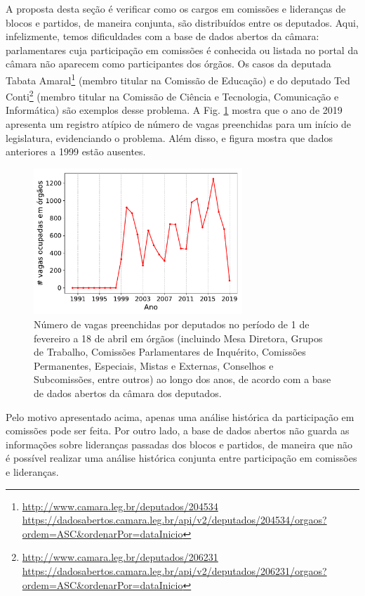 \documentclass[12pt,a4paper]{article}
\newcommand{\footurl}[1]{{\scriptsize\url{#1}}}
\begin{document}
A proposta desta seção é verificar como os cargos em comissões e lideranças de blocos e partidos,
de maneira conjunta, são distribuídos entre os deputados. Aqui, infelizmente, temos dificuldades com a base de dados
abertos da câmara: parlamentares cuja participação em comissões é conhecida ou listada no portal
da câmara não aparecem como participantes dos órgãos. Os casos da deputada Tabata
Amaral\footnote{\footurl{http://www.camara.leg.br/deputados/204534}\\
  \footurl{https://dadosabertos.camara.leg.br/api/v2/deputados/204534/orgaos?ordem=ASC\&ordenarPor=dataInicio}}
(membro titular na Comissão de Educação) e do deputado
Ted Conti\footnote{\footurl{http://www.camara.leg.br/deputados/206231}\\
  \footurl{https://dadosabertos.camara.leg.br/api/v2/deputados/206231/orgaos?ordem=ASC\&ordenarPor=dataInicio}}
(membro titular na Comissão de Ciência e Tecnologia, Comunicação e Informática) são exemplos desse
problema. A Fig. \ref{fig:orgaos-por-ano} mostra que o ano de 2019 apresenta um registro atípico de número
de vagas preenchidas para um início de legislatura, evidenciando o problema. Além disso, e figura mostra que dados anteriores a 1999 estão
ausentes.

\begin{figure}[H]
\centering
\includegraphics[width=0.7\textwidth]{graficos/orgaos-ocupados-por-ano_2019-05-02.pdf}
\caption{Número de vagas preenchidas por deputados no período de 1 de fevereiro a 18 de abril em órgãos (incluindo Mesa Diretora,
  Grupos de Trabalho, Comissões Parlamentares de Inquérito, Comissões Permanentes, Especiais, Mistas e Externas,
  Conselhos e Subcomissões, entre outros) ao longo dos anos, de acordo com a base de dados abertos da câmara dos deputados.}
\label{fig:orgaos-por-ano}
\end{figure} 

Pelo motivo apresentado acima, apenas uma análise histórica da participação em comissões pode ser feita. Por outro lado,
a base de dados abertos não guarda as informações sobre lideranças passadas dos blocos e partidos, de maneira
que não é possível realizar uma análise histórica conjunta entre participação em comissões e lideranças.
\end{document}
